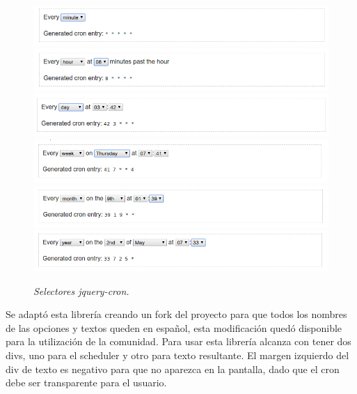 \begin{figure}[H]
  \centering
  \includegraphics[width=\textwidth, keepaspectratio]{images/jquery-cron1}
  \includegraphics[width=\textwidth, keepaspectratio]{images/jquery-cron2}
  \includegraphics[width=\textwidth, keepaspectratio]{images/jquery-cron3}
  \includegraphics[width=\textwidth, keepaspectratio]{images/jquery-cron4}
  \includegraphics[width=\textwidth, keepaspectratio]{images/jquery-cron5}
  \includegraphics[width=\textwidth, keepaspectratio]{images/jquery-cron6}
  \caption{\textit{Selectores jquery-cron.}}
  \label{fig:jquery-cron-selectors}
\end{figure}

Se adaptó esta librería creando un fork del proyecto para que todos los nombres de las opciones y textos queden en español, esta modificación quedó disponible para la utilización de la comunidad.
Para usar esta librería alcanza con tener dos divs, uno para el scheduler y otro para texto resultante. El margen izquierdo del div de texto es negativo para que no aparezca en la pantalla, dado que el cron debe ser transparente para el usuario.

